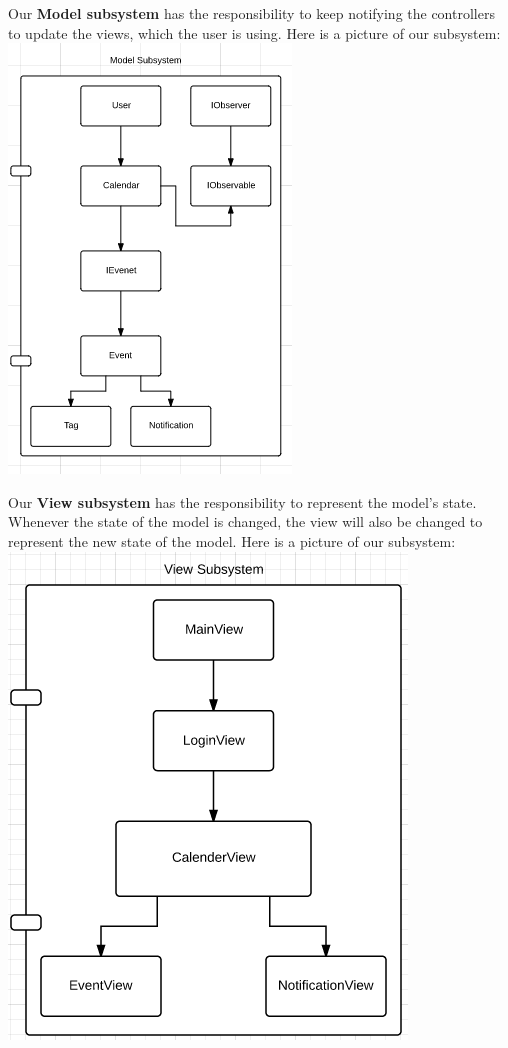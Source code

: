Our \textbf{Model subsystem} has the responsibility to keep notifying the controllers to update the views, which the user is using. Here is a picture of our subsystem:\\
\includegraphics[scale=0.8]{modelSubsystem}

\pagebreak

Our \textbf{View subsystem} has the responsibility to represent the model’s state. Whenever the state of the model is changed, the view will also be changed to represent the new state of the model. Here is a picture of our subsystem:\\
\includegraphics[scale=0.8]{viewSubsystem}
\\

